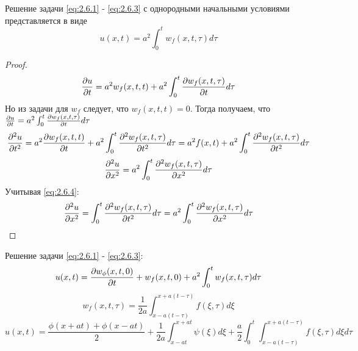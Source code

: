 \documentclass[../main.tex]{subfiles}
\begin{document}
\begin{theorem}
	Решение задачи  \eqref{eq:2.6.1} -  \eqref{eq:2.6.3} с однородными начальными условиями представляется в виде
	\begin{equation}
		u(x, t) = a^2\int_0^tw_f(x, t, \tau)d\tau
	\end{equation}
\end{theorem}
\begin{proof}
	$$
		\frac{\partial u}{\partial t}=a^2w_f(x, t, t) + a^2 \int_0^t\frac{\partial w_f(x,t,\tau)}{\partial t}d\tau
	$$
	Но из задачи для $w_f$ следует, что $w_f(x, t, t) = 0$. Тогда получаем, что
	$ \frac{\partial u}{\partial t} = a^2\int_0^t\frac{\partial w_f(x, t, \tau)}{\partial t}d\tau$
	$$
		\frac{\partial ^2u}{\partial t^2}=a^2\frac{\partial w_f(x, t, t)}{\partial t} + a^2\int_0^t\frac{\partial ^2w_f(x, t, \tau)}{\partial t^2}d\tau =
		a^2f(x, t) + a^2\int_0^t\frac{\partial ^2w_f(x, t, \tau)}{\partial t^2}d\tau
	$$
	$$
		\frac{\partial ^2u}{\partial x^2} = a^2\int_0^t\frac{\partial ^2w_f(x, t, \tau)}{\partial x^2}d\tau
	$$
	Учитывая \eqref{eq:2.6.4}:
	$$
		\frac{\partial ^2u}{\partial x^2} = \int_0^t\frac{\partial ^2w_f(x, t, \tau)}{\partial t^2}d\tau =  a^2\int_0^t\frac{\partial ^2w_f(x, t, \tau)}{\partial x^2}d\tau
	$$

\end{proof}
Решение задачи \eqref{eq:2.6.1} - \eqref{eq:2.6.3}:
$$
	u(x, t) = \frac{\partial w_\phi(x, t, 0)}{\partial t} + w_f(x, t, 0) + a^2\int_0^tw_f(x, t, \tau)d\tau
$$
$$
	w_f(x, t, \tau)=\frac{1}{2a}\int_{x - a(t-\tau)}^{x+a(t-\tau)}f(\xi, \tau)d\xi
$$
$$
	u(x, t) = \frac{\phi(x + at) + \phi(x - at)}{2} + \frac{1}{2a}\int_{x - at}^{x + at}\psi(\xi)d\xi + \frac{a}{2}\int_0^{t}\int_{x - a(t - \tau)}^{x + a(t - \tau)}f(\xi,\tau)d\xi d\tau
$$
\end{document}
